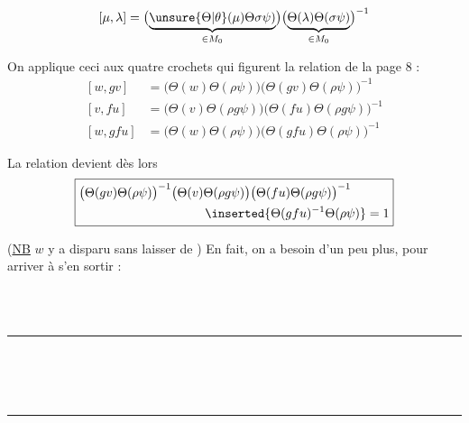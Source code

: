 
\[
[\mu,\lambda]=\bigl(\underbrace{\unsure{\Theta|\theta}(\mu)\Theta\sigma\psi)}_{\in M_0}\bigr)\bigl(\underbrace{\Theta(\lambda)\Theta(\sigma\psi)}_{\in M_0}\bigr)^{-1}
\]

On applique ceci aux quatre crochets qui figurent  la relation de la page 8 :
\[
\begin{aligned}[w,gv]&=\bigl(\Theta(w)\Theta(\rho\psi)\bigr)\bigl(\Theta(gv)\Theta(\rho\psi)\bigr)^{-1}\\ [v,fu]&=\bigl(\Theta(v)\Theta(\rho g\psi)\bigr)\bigl(\Theta(fu)\Theta(\rho g\psi)\bigr)^{-1}\\ [w,gfu]&=\bigl(\Theta(w)\Theta(\rho\psi)\bigr)\bigl(\Theta(gfu)\Theta(\rho\psi)\bigr)^{-1}\end{aligned}
\]

La relation devient dès lors
\[
\boxed{\begin{aligned}&\bigl(\Theta(gv)\Theta(\rho\psi)\bigr)^{-1}\bigl(\Theta(v)\Theta(\rho g\psi)\bigr)\bigl(\Theta(fu)\Theta(\rho g\psi)\bigr)^{-1}\\ &\hspace{10em}\inserted{\Theta(gfu)^{-1}\Theta(\rho\psi)}=1\end{aligned}}
\]

(\uline{NB} $w$ y a disparu sans laisser de ) En fait, on a besoin d'un peu plus, pour arriver à s'en sortir :
\par\smallskip
{\footnotesize\noindent\begin{minipage}[t]{.46\linewidth}\raggedright
{}\\ \\ \rule{2.6em}{.3pt}\\ \\ \\ \rule{2.6em}{.3pt}\\ \\ 
\end{minipage}\hfill%
\begin{minipage}[t]{.51\linewidth}\raggedright
{}\\ \\ \\ \\ 
\end{minipage}\par}

